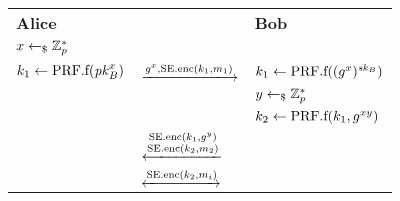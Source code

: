 \begin{tabular}{lC{3cm}l}
    \textbf{Alice} & & \textbf{Bob} \\
    $x\gets_\$\mathbb{Z}_p^*$ & & \\
    $k_1\gets\mathrm{PRF}.\mathrm{f}(\mathit{pk}_B^x)$ & $\xlongrightarrow{g^x,\SYEenc(k_1,m_1)}$ & $k_1\gets\mathrm{PRF}.\mathrm{f}((g^x)^{\mathit{sk}_B})$\\
    & & $y\gets_\$\mathbb{Z}_p^*$ \\
    & & $k_2\gets\mathrm{PRF}.\mathrm{f}(k_1, g^{xy})$\\
    & $\xlongleftarrow{\substack{\SYEenc(k_1,g^y)\\\SYEenc(k_2,m_2)}}$ & \\
    & $\xleftrightarrow{\mathrm{SE}.\mathrm{enc}(k_2,m_i)}$ &
\end{tabular}